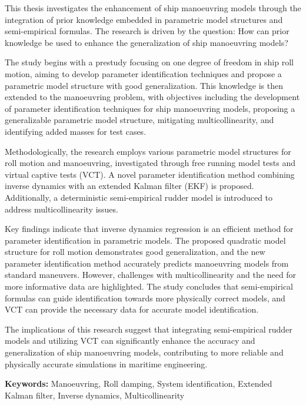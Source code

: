 This thesis investigates the enhancement of ship manoeuvring models through the integration of prior knowledge embedded in parametric model structures and semi-empirical formulas. The research is driven by the question: How can prior knowledge be used to enhance the generalization of ship manoeuvring models?

The study begins with a prestudy focusing on one degree of freedom in ship roll motion, aiming to develop parameter identification techniques and propose a parametric model structure with good generalization. This knowledge is then extended to the manoeuvring problem, with objectives including the development of parameter identification techniques for ship manoeuvring models, proposing a generalizable parametric model structure, mitigating multicollinearity, and identifying added masses for test cases.

Methodologically, the research employs various parametric model structures for roll motion and manoeuvring, investigated through free running model tests and virtual captive tests (VCT). A novel parameter identification method combining inverse dynamics with an extended Kalman filter (EKF) is proposed. Additionally, a deterministic semi-empirical rudder model is introduced to address multicollinearity issues.

Key findings indicate that inverse dynamics regression is an efficient method for parameter identification in parametric models. The proposed quadratic model structure for roll motion demonstrates good generalization, and the new parameter identification method accurately predicts manoeuvring models from standard maneuvers. However, challenges with multicollinearity and the need for more informative data are highlighted. The study concludes that semi-empirical formulas can guide identification towards more physically correct models, and VCT can provide the necessary data for accurate model identification.

The implications of this research suggest that integrating semi-empirical rudder models and utilizing VCT can significantly enhance the accuracy and generalization of ship manoeuvring models, contributing to more reliable and physically accurate simulations in maritime engineering.


\vspace{0.3cm}
\noindent\textbf{Keywords:} Manoeuvring, Roll damping, System identification, Extended Kalman filter, Inverse dynamics, Multicollinearity
\cleardoublepage
